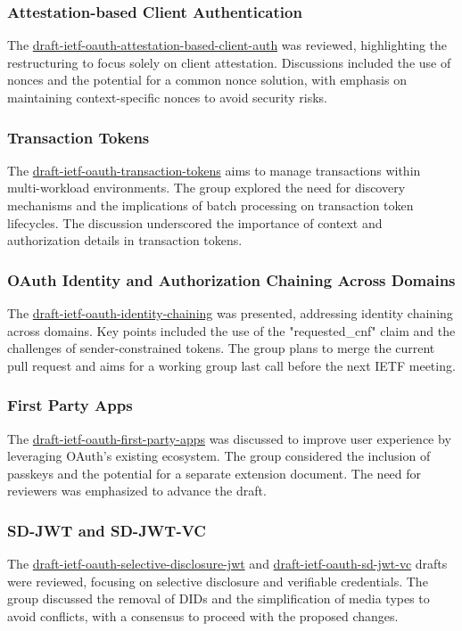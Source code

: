 \documentclass{article}
\begin{document}
\subsubsection{Attestation-based Client Authentication}
The \href{https://datatracker.ietf.org/doc/html/draft-ietf-oauth-attestation-based-client-auth}{draft-ietf-oauth-attestation-based-client-auth} was reviewed, highlighting the restructuring to focus solely on client attestation. Discussions included the use of nonces and the potential for a common nonce solution, with emphasis on maintaining context-specific nonces to avoid security risks.

\subsubsection{Transaction Tokens}
The \href{https://datatracker.ietf.org/doc/html/draft-ietf-oauth-transaction-tokens}{draft-ietf-oauth-transaction-tokens} aims to manage transactions within multi-workload environments. The group explored the need for discovery mechanisms and the implications of batch processing on transaction token lifecycles. The discussion underscored the importance of context and authorization details in transaction tokens.

\subsubsection{OAuth Identity and Authorization Chaining Across Domains}
The \href{https://datatracker.ietf.org/doc/html/draft-ietf-oauth-identity-chaining}{draft-ietf-oauth-identity-chaining} was presented, addressing identity chaining across domains. Key points included the use of the "requested\_cnf" claim and the challenges of sender-constrained tokens. The group plans to merge the current pull request and aims for a working group last call before the next IETF meeting.

\subsubsection{First Party Apps}
The \href{https://datatracker.ietf.org/doc/html/draft-ietf-oauth-first-party-apps}{draft-ietf-oauth-first-party-apps} was discussed to improve user experience by leveraging OAuth's existing ecosystem. The group considered the inclusion of passkeys and the potential for a separate extension document. The need for reviewers was emphasized to advance the draft.

\subsubsection{SD-JWT and SD-JWT-VC}
The \href{https://datatracker.ietf.org/doc/html/draft-ietf-oauth-selective-disclosure-jwt}{draft-ietf-oauth-selective-disclosure-jwt} and \href{https://datatracker.ietf.org/doc/html/draft-ietf-oauth-sd-jwt-vc}{draft-ietf-oauth-sd-jwt-vc} drafts were reviewed, focusing on selective disclosure and verifiable credentials. The group discussed the removal of DIDs and the simplification of media types to avoid conflicts, with a consensus to proceed with the proposed changes.
\end{document}
